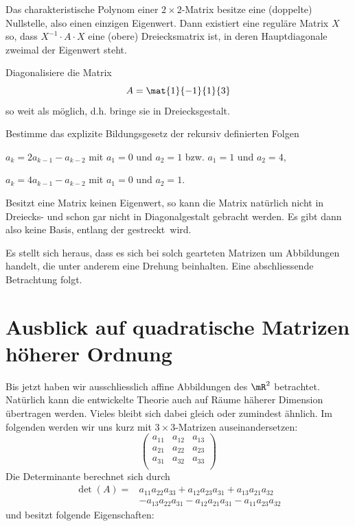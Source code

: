 \documentclass[%
11pt,%
twoside,%
titlepage,%
german,%
headsepline%
]{scrartcl}
\begin{document}
\begin{satz}
Das charakteristische Polynom einer $2 \times 2$-Matrix besitze eine (doppelte) Nullstelle, also einen einzigen Eigenwert. Dann existiert eine reguläre Matrix $X$ so, dass $X^{-1}\cdot A\cdot X$ eine (obere) Dreiecksmatrix ist, in deren Hauptdiagonale zweimal der Eigenwert steht.
\end{satz}

\begin{ueb}
Diagonalisiere die Matrix
$$A=\mat{1}{-1}{1}{3}$$
so weit als möglich, d.h. bringe sie in Dreiecksgestalt.
\end{ueb}

\begin{ueb}
Bestimme das explizite Bildungsgesetz der rekursiv definierten Folgen
\begin{enumeratea}
\item $a_k=2a_{k-1}-a_{k-2}$ mit $a_1=0$ und $a_2=1$ bzw. $a_1=1$ und $a_2=4$,
\item $a_k=4a_{k-1}-a_{k-2}$ mit $a_1=0$ und $a_2=1$.
\end{enumeratea}
\end{ueb}

\begin{bem}
Besitzt eine Matrix keinen Eigenwert, so kann die Matrix natürlich nicht in Dreiecks- und schon gar nicht in Diagonalgestalt gebracht werden. Es gibt dann also keine Basis, entlang der \glqq gestreckt\grqq\ wird.

Es stellt sich heraus, dass es sich bei solch gearteten Matrizen um Abbildungen handelt, die unter anderem eine Drehung beinhalten. Eine abschliessende Betrachtung folgt.
\end{bem}

\newpage

\appendix

\section{Ausblick auf quadratische Matrizen höherer Ordnung}

Bis jetzt haben wir ausschliesslich affine Abbildungen des $\mR^2$ betrachtet. Natürlich kann die entwickelte Theorie auch auf Räume häherer Dimension übertragen werden. Vieles bleibt sich dabei gleich oder zumindest ähnlich. Im folgenden werden wir uns kurz mit $3 \times 3$-Matrizen auseinandersetzen:
$$\begin{pmatrix}
a_{11}&a_{12}&a_{13}\\
a_{21}&a_{22}&a_{23}\\
a_{31}&a_{32}&a_{33}\\
\end{pmatrix}$$
Die Determinante berechnet sich durch
\begin{align*}
\det(A)=&a_{11}a_{22}a_{33}+a_{12}a_{23}a_{31}+a_{13}a_{21}a_{32}\\
&-a_{13}a_{22}a_{31}-a_{12}a_{21}a_{31}-a_{11}a_{23}a_{32}
\end{align*}
und besitzt folgende Eigenschaften:
\end{document}
